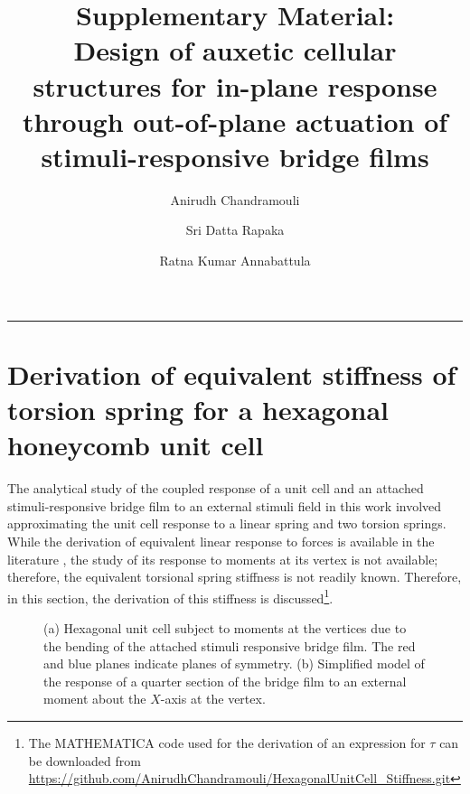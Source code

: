 \documentclass[final,a4paper,3p,times]{elsarticle}
\begin{document}
\begin{frontmatter}
\title{Supplementary Material:\\Design of auxetic cellular structures for in-plane response through out-of-plane actuation of stimuli-responsive bridge films}
\author[inst1]{Anirudh Chandramouli}
\author[inst2]{Sri Datta Rapaka}
\author[inst1]{Ratna Kumar Annabattula}
\end{frontmatter}
\hrule
\section{Derivation of equivalent stiffness of torsion spring for a hexagonal honeycomb unit cell}
The analytical study of the coupled response of a unit cell and an attached stimuli-responsive bridge film to an external stimuli field in this work involved approximating the unit cell response to a linear spring and two torsion springs. While the derivation of equivalent linear response to forces is available in the literature \citep{gibson_ashby_1997}, the study of its response to moments at its vertex is not available; therefore, the equivalent torsional spring stiffness is not readily known. Therefore, in this section, the derivation of this stiffness is discussed\footnote{The MATHEMATICA code used for the derivation of an expression for $\tau$ can be downloaded from \href{https://github.com/AnirudhChandramouli/HexagonalUnitCell_Stiffness.git}{https://github.com/AnirudhChandramouli/HexagonalUnitCell\_Stiffness.git}}. 
\begin{figure}[htpb]
\begin{center}
 \hfill
{} 
\end{center}
    \caption{(a) Hexagonal unit cell subject to moments at the vertices due to the bending of the attached stimuli responsive bridge film. The red and blue planes indicate planes of symmetry. (b) Simplified model of the response of a quarter section of the bridge film to an external moment about the $X$-axis at the vertex.}
    \label{fig:Schematic}
\end{figure}
\end{document}
